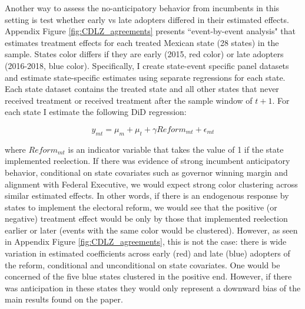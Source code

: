 \documentclass[12pt]{amsart}
\numberwithin{equation}{section}
\theoremstyle{definition}
\theoremstyle{definition}
\theoremstyle{definition}
\begin{document}
\begin{appendix}
Another way to assess the no-anticipatory behavior from incumbents in this setting is test whether early vs late adopters differed in their estimated effects. Appendix Figure \ref{fig:CDLZ_agreements} presents \citet{cengiz_etal_2019} ``event-by-event analysis" that estimates treatment effects for each treated Mexican state (28 states) in the sample. States color differs if they are early (2015, red color) or late adopters (2016-2018, blue color). Specifically, I create state-event specific panel datasets and estimate state-specific estimates using separate regressions for each state. Each state dataset contains the treated state and all other states that never received treatment or received treatment after the sample window of $t+1$. For each state I estimate the following DiD regression: 
   
\begin{equation}
y_{mt}=\mu_m	 + \mu_t + \gamma Reform_{mt} + \epsilon_{mt}
\end{equation}

where $Reform_{mt}$ is an indicator variable that takes the value of 1 if the state implemented reelection. If there was evidence of strong incumbent anticipatory behavior, conditional on state covariates such as governor winning margin and alignment with Federal Executive, we would expect strong color clustering across similar estimated effects. In other words, if there is an endogenous response by states to implement the electoral reform, we would see that the positive (or negative) treatment effect would be only by those that implemented reelection earlier or later (events with the same color would be clustered). However, as seen in Appendix Figure \ref{fig:CDLZ_agreements}, this is not the case: there is wide variation in estimated coefficients across early (red) and late (blue) adopters of the reform, conditional and unconditional on state covariates. One would be concerned of the five blue states clustered in the positive end. However, if there was anticipation in these states they would only represent a downward bias of the main results found on the paper.  


\end{appendix}
\end{document}
